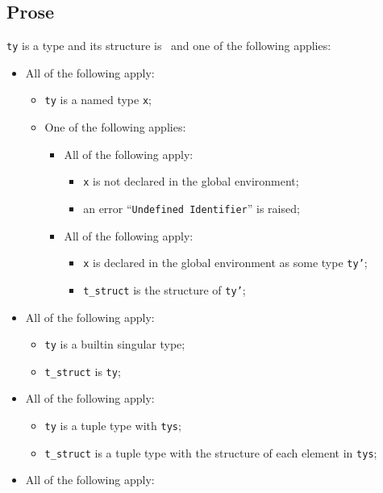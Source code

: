 \documentclass{book}
\begin{document}
    \subsection{Prose}
    \texttt{ty} is a type and its structure is \tstruct\ and one of the following
    applies:
    \begin{itemize}
    \item All of the following apply:
      \begin{itemize}
      \item \texttt{ty} is a named type \texttt{x};
      \item One of the following applies:
        \begin{itemize}
        \item All of the following apply:
          \begin{itemize}
          \item \texttt{x} is not declared in the global environment;
          \item an error ``\texttt{Undefined Identifier}'' is raised;
          \end{itemize}
        \item All of the following apply:
          \begin{itemize}
          \item \texttt{x} is declared in the global environment as some type \texttt{ty'};
          \item \texttt{t\_struct} is the structure of \texttt{ty'};
          \end{itemize}
       \end{itemize}
      \end{itemize}
    \item All of the following apply:
      \begin{itemize}
      \item \texttt{ty} is a builtin singular type;
      \item \texttt{t\_struct} is \texttt{ty};
      \end{itemize}
    \item All of the following apply:
      \begin{itemize}
      \item \texttt{ty} is a tuple type with \texttt{tys};
      \item \texttt{t\_struct} is a tuple type with the structure of each element in \texttt{tys};
      \end{itemize}
    \item All of the following apply:

\end{itemize}
\end{document}
